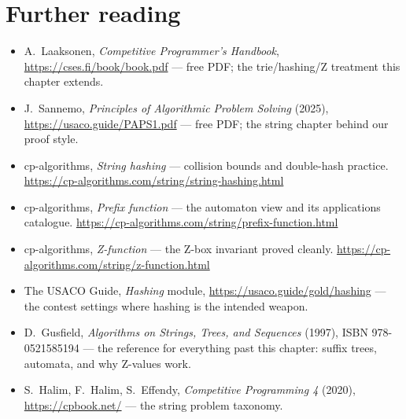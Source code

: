 \chapternotes

\section*{Further reading}
\begin{itemize}
\item A.~Laaksonen, \emph{Competitive Programmer's Handbook},
\url{https://cses.fi/book/book.pdf} --- free PDF; the
trie/hashing/Z treatment this chapter extends.
\item J.~Sannemo, \emph{Principles of Algorithmic Problem Solving}
(2025), \url{https://usaco.guide/PAPS1.pdf} --- free PDF; the
string chapter behind our proof style.
\item cp-algorithms, \emph{String hashing} --- collision bounds
and double-hash practice.
\newline\url{https://cp-algorithms.com/string/string-hashing.html}
\item cp-algorithms, \emph{Prefix function} --- the automaton
view and its applications catalogue.
\newline\url{https://cp-algorithms.com/string/prefix-function.html}
\item cp-algorithms, \emph{Z-function} --- the Z-box invariant
proved cleanly.
\newline\url{https://cp-algorithms.com/string/z-function.html}
\item The USACO Guide, \emph{Hashing} module,
\url{https://usaco.guide/gold/hashing} --- the contest settings
where hashing is the intended weapon.
\item D.~Gusfield, \emph{Algorithms on Strings, Trees, and
Sequences} (1997), ISBN 978-0521585194 --- the reference for
everything past this chapter: suffix trees, automata, and why
Z-values work.
\item S.~Halim, F.~Halim, S.~Effendy, \emph{Competitive
Programming 4} (2020), \url{https://cpbook.net/} --- the string
problem taxonomy.
\end{itemize}

